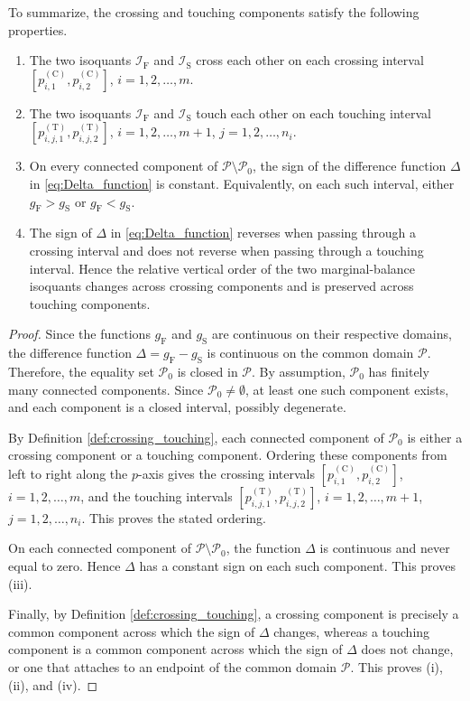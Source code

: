 \documentclass[a4paper,12pt]{article}
\begin{document}
\begin{lemma}
To summarize, the crossing and touching components satisfy the following properties.
\begin{enumerate}
\item[(i)] The two isoquants $\mathcal{I}_{\text{F}}$ and  $\mathcal{I}_{\text{S}}$ cross each other on each crossing interval $\left[p^{\left(\text{C}\right)}_{i,1},p^{\left(\text{C}\right)}_{i,2}\right]$, $i=1,2,\dots,m$.
\item[(ii)] The two isoquants $\mathcal{I}_{\text{F}}$ and  $\mathcal{I}_{\text{S}}$ touch each other on each touching interval $\left[p^{\left(\text{T}\right)}_{i,j,1},p^{\left(\text{T}\right)}_{i,j,2}\right]$, $i=1,2,\dots,m+1$, $j=1,2,\dots,n_i$.
\item[(iii)] On every connected component of $\mathcal{P}\setminus\mathcal{P}_0$, the sign of the difference function $\Delta$ in \eqref{eq:Delta_function} is constant. Equivalently, on each such interval, either $g_{\text{F}}>g_{\text{S}}$ or $g_{\text{F}}<g_{\text{S}}$.
\item[(iv)] The sign of $\Delta$ in \eqref{eq:Delta_function} reverses when passing through a crossing interval and does not reverse when passing through a touching interval. Hence the relative vertical order of the two marginal-balance isoquants changes across crossing components and is preserved across touching components.
\end{enumerate}
\end{lemma}

\begin{proof}
Since the functions $g_{\text{F}}$ and $g_{\text{S}}$ are continuous on their respective domains, the difference function $\Delta=g_{\text{F}}-g_{\text{S}}$ is continuous on the common domain $\mathcal{P}$. Therefore, the equality set $\mathcal{P}_0$ is closed in $\mathcal{P}$. By assumption, $\mathcal{P}_0$ has finitely many connected components. Since $\mathcal{P}_0\neq\emptyset$, at least one such component exists, and each component is a closed interval, possibly degenerate.

By Definition \ref{def:crossing_touching}, each connected component of $\mathcal{P}_0$ is either a crossing component or a touching component. Ordering these components from left to right along the $p$-axis gives the crossing intervals $\left[p^{\left(\text{C}\right)}_{i,1},p^{\left(\text{C}\right)}_{i,2}\right]$, $i=1,2,\dots,m$, and the touching intervals $\left[p^{\left(\text{T}\right)}_{i,j,1},p^{\left(\text{T}\right)}_{i,j,2}\right]$, $i=1,2,\dots,m+1$, $j=1,2,\dots,n_i$. This proves the stated ordering.

On each connected component of $\mathcal{P}\setminus\mathcal{P}_0$, the function $\Delta$ is continuous and never equal to zero. Hence $\Delta$ has a constant sign on each such component. This proves (iii).

Finally, by Definition \ref{def:crossing_touching}, a crossing component is precisely a common component across which the sign of $\Delta$ changes, whereas a touching component is a common component across which the sign of $\Delta$ does not change, or one that attaches to an endpoint of the common domain $\mathcal{P}$. This proves (i), (ii), and (iv).
\end{proof}
\end{document}
